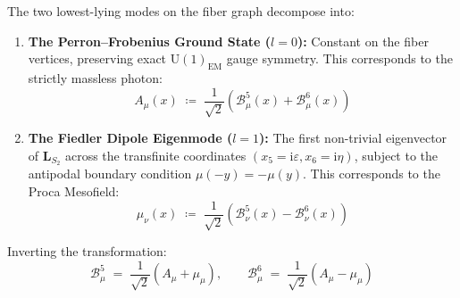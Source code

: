 \documentclass[
    12pt,
    a4paper,
    headings=normal,
    twoside=false,
    open=any,
    parskip=half
]{scrbook}
\newcommand{\iu}{\mathrm{i}}
\begin{document}
The two lowest-lying modes on the fiber graph decompose into:
\begin{enumerate}[label=(\alph*), noitemsep]
    \item \textbf{The Perron--Frobenius Ground State ($l = 0$):} Constant on the fiber vertices, preserving exact $\mathrm{U}(1)_{\text{EM}}$ gauge symmetry. This corresponds to the strictly massless photon:
    \begin{equation}
    A_\mu(x) \;\coloneqq\; \frac{1}{\sqrt{2}}\left( \mathcal{B}_\mu^5(x) + \mathcal{B}_\mu^6(x) \right)
    \end{equation}
    \item \textbf{The Fiedler Dipole Eigenmode ($l = 1$):} The first non-trivial eigenvector of $\mathbf{L}_{S_2}$ across the transfinite coordinates $(x_5 = \iu\varepsilon, x_6 = \iu\eta)$, subject to the antipodal boundary condition $\mu(-y) = -\mu(y)$. This corresponds to the Proca Mesofield:
    \begin{equation}
    \mu_\nu(x) \;\coloneqq\; \frac{1}{\sqrt{2}}\left( \mathcal{B}_\nu^5(x) - \mathcal{B}_\nu^6(x) \right)
    \end{equation}
\end{enumerate}

Inverting the transformation:
\begin{equation}
\mathcal{B}_\mu^5 \;=\; \frac{1}{\sqrt{2}}\left( A_\mu + \mu_\mu \right), \qquad \mathcal{B}_\mu^6 \;=\; \frac{1}{\sqrt{2}}\left( A_\mu - \mu_\mu \right)
\label{eq:ch2_field_rotation}
\end{equation}
\end{document}
